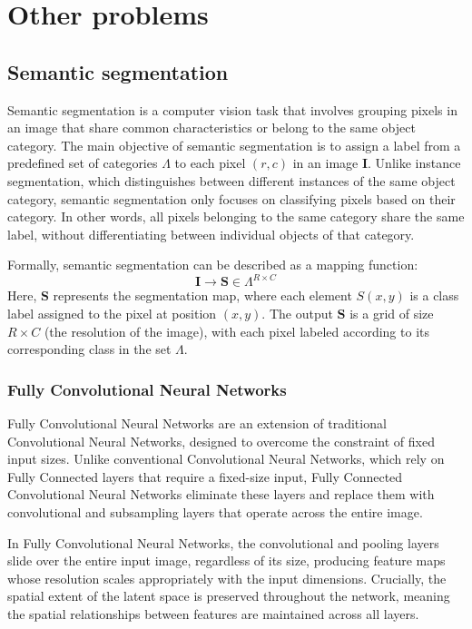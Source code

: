 \section{Other problems}

\subsection{Semantic segmentation}
Semantic segmentation is a computer vision task that involves grouping pixels in an image that share common characteristics or belong to the same object category. 
The main objective of semantic segmentation is to assign a label from a predefined set of categories $\Lambda$ to each pixel $(r, c)$ in an image $\mathbf{I}$.
Unlike instance segmentation, which distinguishes between different instances of the same object category, semantic segmentation only focuses on classifying pixels based on their category. 
In other words, all pixels belonging to the same category share the same label, without differentiating between individual objects of that category.

Formally, semantic segmentation can be described as a mapping function:
\[\mathbf{I}\rightarrow \mathbf{S}\in\Lambda^{R\times C}\]
Here, $\mathbf{S}$ represents the segmentation map, where each element $S(x, y)$ is a class label assigned to the pixel at position $(x, y)$. 
The output $\mathbf{S}$ is a grid of size $R \times C$ (the resolution of the image), with each pixel labeled according to its corresponding class in the set $\Lambda$.

\subsubsection{Fully Convolutional Neural Networks}
Fully Convolutional Neural Networks are an extension of traditional Convolutional Neural Networks, designed to overcome the constraint of fixed input sizes. 
Unlike conventional Convolutional Neural Networks, which rely on Fully Connected layers that require a fixed-size input, Fully Connected Convolutional Neural Networks eliminate these layers and replace them with convolutional and subsampling layers that operate across the entire image.

In Fully Convolutional Neural Networks, the convolutional and pooling layers slide over the entire input image, regardless of its size, producing feature maps whose resolution scales appropriately with the input dimensions.
Crucially, the spatial extent of the latent space is preserved throughout the network, meaning the spatial relationships between features are maintained across all layers. 

